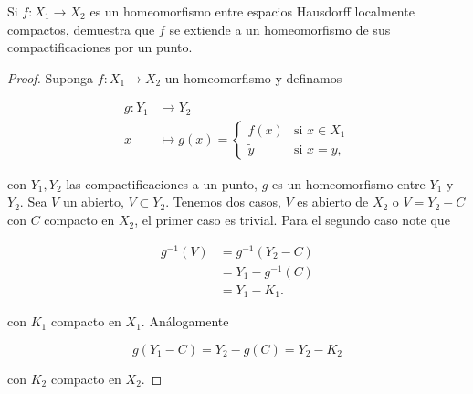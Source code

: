 
\item Si $f: X_1 \rightarrow X_2$ es un homeomorfismo entre espacios Hausdorff localmente compactos, demuestra que $f$ se extiende a un homeomorfismo de sus compactificaciones por un punto.

\begin{proof}
    Suponga $f:X_1\to X_2$ un homeomorfismo y definamos

    \begin{align*}
        g : Y_1 &\longrightarrow Y_2 \\
        x &\longmapsto g(x) = \begin{cases}
            f(x) &\text{si } x\in X_1\\
            \tilde{y} &\text{si }x=y,
        \end{cases}
    \end{align*}

    con $Y_1, Y_2$ las compactificaciones a un punto, $g$ es un homeomorfismo entre $Y_1$ y $Y_2$. Sea $V$ un abierto, $V\subset Y_2$. Tenemos dos casos, $V$ es abierto de $X_2$ o $V=Y_2-C$ con $C$ compacto en $X_2$, el primer caso es trivial. Para el segundo caso note que 

    \begin{align*}
        g^{-1}(V)&=g^{-1}(Y_2-C)\\
        &=Y_1-g^{-1}(C)\\
        &=Y_1- K_1
    .\end{align*}

    con $K_1$ compacto en $X_1$. Análogamente 

    $$g(Y_1-C)=Y_2-g(C)=Y_2-K_2$$

    con $K_2$ compacto en $X_2$.
        
\end{proof}

